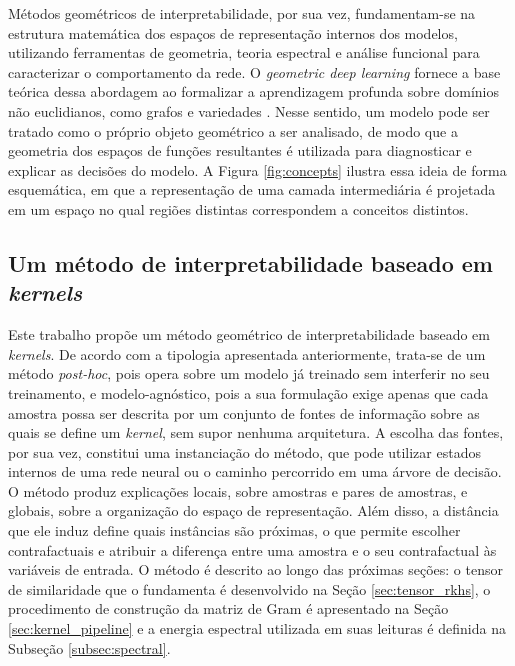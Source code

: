 Métodos geométricos de interpretabilidade, por sua vez, fundamentam-se na estrutura matemática dos espaços de representação internos dos modelos, utilizando ferramentas de geometria, teoria espectral e análise funcional para caracterizar o comportamento da rede. O \textit{geometric deep learning} fornece a base teórica dessa abordagem ao formalizar a aprendizagem profunda sobre domínios não euclidianos, como grafos e variedades \citep{Cao2020, Bronstein2017}. Nesse sentido, um modelo pode ser tratado como o próprio objeto geométrico a ser analisado, de modo que a geometria dos espaços de funções resultantes é utilizada para diagnosticar e explicar as decisões do modelo. A Figura \ref{fig:concepts} ilustra essa ideia de forma esquemática, em que a representação de uma camada intermediária é projetada em um espaço no qual regiões distintas correspondem a conceitos distintos.

\subsection{Um método de interpretabilidade baseado em \textit{kernels}}\label{subsec:metodo_proposto}

Este trabalho propõe um método geométrico de interpretabilidade baseado em \textit{kernels}. De acordo com a tipologia apresentada anteriormente, trata-se de um método \textit{post-hoc}, pois opera sobre um modelo já treinado sem interferir no seu treinamento, e modelo-agnóstico, pois a sua formulação exige apenas que cada amostra possa ser descrita por um conjunto de fontes de informação sobre as quais se define um \textit{kernel}, sem supor nenhuma arquitetura. A escolha das fontes, por sua vez, constitui uma instanciação do método, que pode utilizar estados internos de uma rede neural ou o caminho percorrido em uma árvore de decisão. O método produz explicações locais, sobre amostras e pares de amostras, e globais, sobre a organização do espaço de representação. Além disso, a distância que ele induz define quais instâncias são próximas, o que permite escolher contrafactuais e atribuir a diferença entre uma amostra e o seu contrafactual às variáveis de entrada. O método é descrito ao longo das próximas seções: o tensor de similaridade que o fundamenta é desenvolvido na Seção \ref{sec:tensor_rkhs}, o procedimento de construção da matriz de Gram é apresentado na Seção \ref{sec:kernel_pipeline} e a energia espectral utilizada em suas leituras é definida na Subseção \ref{subsec:spectral}.

